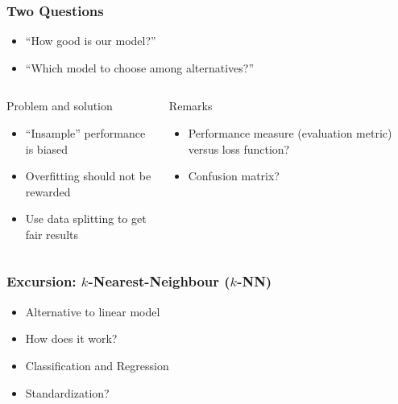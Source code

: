 \documentclass[
    utf8,
    aspectratio=169
]{beamer}  %
\begin{document}
\begin{frame}
	\frametitle{Two Questions}
	
	\begin{itemize}
		\item ``How good is our model?''
		\item ``Which model to choose among alternatives?''
	\end{itemize}
	
	\vfill
	
	\begin{columns}[onlytextwidth]
		\begin{block}{Problem and solution}
			\begin{itemize}
				\item ``Insample'' performance is biased
				\item Overfitting should not be rewarded
				\item Use data splitting to get fair results
			\end{itemize}
		\end{block}
	
		\begin{alertblock}{Remarks}
			\begin{itemize}
				\item Performance measure (evaluation metric) versus loss function?
				\item Confusion matrix?
			\end{itemize}
		\end{alertblock}
	\end{columns}
\end{frame}

\begin{frame}
	\frametitle{Excursion: $k$-Nearest-Neighbour ($k$-NN)}
	\begin{itemize}
		\item Alternative to linear model
		\item How does it work?
		\item Classification and Regression
		\item Standardization?
	\end{itemize}
	
	\vfill
	
	\begin{example}
	\end{example}
\end{frame}
\end{document}
